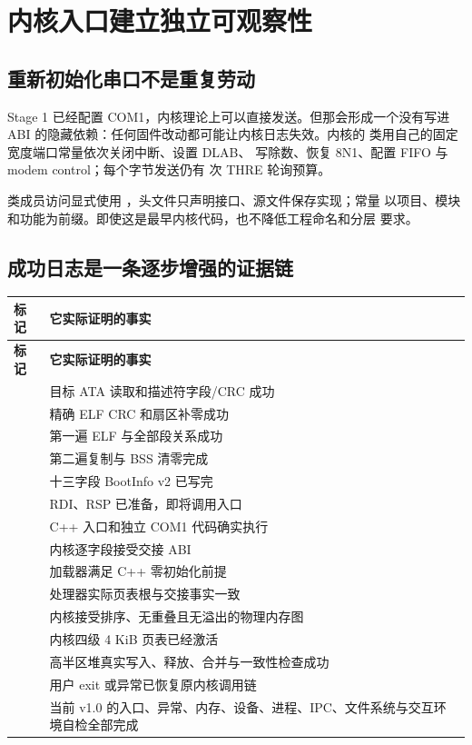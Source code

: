 \section{内核入口建立独立可观察性}

\subsection{重新初始化串口不是重复劳动}

Stage 1 已经配置 COM1，内核理论上可以直接发送。但那会形成一个没有写进 ABI
的隐藏依赖：任何固件改动都可能让内核日志失效。内核的
 类用自己的固定宽度端口常量依次关闭中断、设置 DLAB、
写除数、恢复 8N1、配置 FIFO 与 modem control；每个字节发送仍有
 次 THRE 轮询预算。

类成员访问显式使用 ，头文件只声明接口、源文件保存实现；常量
以项目、模块和功能为前缀。即使这是最早内核代码，也不降低工程命名和分层
要求。

\subsection{成功日志是一条逐步增强的证据链}

\begin{longtable}{L{0.38\textwidth}L{0.48\textwidth}}
\toprule
\textbf{标记} & \textbf{它实际证明的事实}\\
\midrule
\endfirsthead
\toprule
\textbf{标记} & \textbf{它实际证明的事实}\\
\midrule
\endhead
{} & 目标 ATA 读取和描述符字段/CRC 成功\\
 & 精确 ELF CRC 和扇区补零成功\\
 & 第一遍 ELF 与全部段关系成功\\
 & 第二遍复制与 BSS 清零完成\\
 & 十三字段 BootInfo v2 已写完\\
 & RDI、RSP 已准备，即将调用入口\\
 & C++ 入口和独立 COM1 代码确实执行\\
 & 内核逐字段接受交接 ABI\\
 & 加载器满足 C++ 零初始化前提\\
 & 处理器实际页表根与交接事实一致\\
 & 内核接受排序、无重叠且无溢出的物理内存图\\
 & 内核四级 4 KiB 页表已经激活\\
 & 高半区堆真实写入、释放、合并与一致性检查成功\\
 & 用户 exit 或异常已恢复原内核调用链\\
 & 当前 v1.0 的入口、异常、内存、设备、进程、IPC、文件系统与交互环境自检全部完成\\
\bottomrule
\end{longtable}

